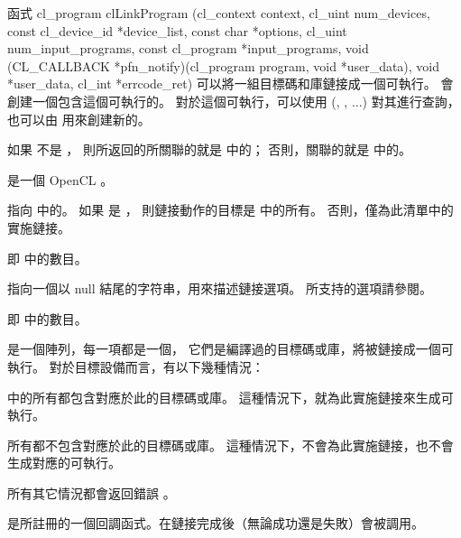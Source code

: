 函式
\startclc
cl_program clLinkProgram (cl_context context,
			cl_uint num_devices,
			const cl_device_id *device_list,
			const char *options,
			cl_uint num_input_programs,
			const cl_program *input_programs,
			void (CL_CALLBACK *pfn_notify)(cl_program program,
						void *user_data),
			void *user_data,
cl_int *errcode_ret)
\stopclc
可以將一組目標碼和庫鏈接成一個可執行。
  會創建一個包含這個可執行的。
對於這個可執行，可以使用 (,
 , ...) 對其進行查詢，
也可以由  用來創建新的。

如果  不是 ，
則所返回的所關聯的就是  中的；
否則，關聯的就是  中的。

 是一個 OpenCL 。

 指向  中的。
如果  是 ，
則鏈接動作的目標是  中的所有。
否則，僅為此清單中的實施鏈接。

 即  中的數目。

 指向一個以 null 結尾的字符串，用來描述鏈接選項。
所支持的選項請參閱。

 即  中的數目。

 是一個陣列，每一項都是一個，
它們是編譯過的目標碼或庫，將被鏈接成一個可執行。
對於目標設備而言，有以下幾種情況：
\startigBase
\item {} 中的所有都包含對應於此的目標碼或庫。
這種情況下，就為此實施鏈接來生成可執行。

\item 所有都不包含對應於此的目標碼或庫。
這種情況下，不會為此實施鏈接，也不會生成對應的可執行。

\item 所有其它情況都會返回錯誤 。
\stopigBase

 是所註冊的一個回調函式。在鏈接完成後（無論成功還是失敗）會被調用。

